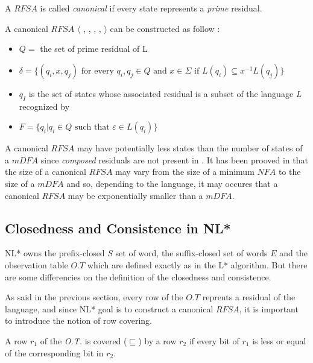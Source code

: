 \begin{definition}
  A $RFSA$ is called \textit{canonical} if every state represents a \textit{prime} residual.
\end{definition}

A canonical $RFSA$ $\langle$ \alphabet{}, \states{}, \transition{}, \qzero{}, \qend{} $\rangle$ can be constructed as follow :
\begin{itemize}
  \item $Q = $ the set of prime residual of L
  \item $\delta = \{(q_i, x, q_j) \text{ for every } q_i, q_j \in Q \text{ and } x \in \Sigma \text{ if } L(q_i) \subseteq x^{-1}L(q_j)\}$
  \item $q_I$ is the set of states whose associated residual is a subset of the language \textit{L} recognized by \automaton{}
  \item $F = \{q_i | q_i \in Q \text{ such that } \varepsilon \in L(q_i)\}$
\end{itemize}

A canonical $RFSA$ \automaton{} may have potentially less states than the number of states of a $mDFA$ since \textit{composed} residuals are not present in  \automaton{}. It has been prooved in  \cite{RFSA} that the size of a canonical $RFSA$ may vary from the size of a minimum $NFA$ to the size of a $mDFA$ and so, depending to the language, it may occures that a canonical $RFSA$ may be exponentially smaller than a $mDFA$.

\subsection{Closedness and Consistence in NL*}

NL* owns the prefix-closed $S$ set of word, the suffix-closed set of words $E$ and the observation table $O.T$ which are defined exactly as in the L* algorithm. But there are some differencies on the definition of the closedness and consistence.

As said in the previous section, every row of the $O.T$ reprents a residual of the language, and since NL* goal is to construct a canonical $RFSA$, it is important to introduce the notion of row covering.

\begin{definition}
  \label{def:row-covering}
  A row $r_1$ of the \textit{O.T.} is covered ($\sqsubseteq$) by a row $r_2$ if every bit of $r_1$ is less or equal of the corresponding bit in $r_2$.
\end{definition}

